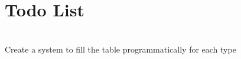\chapter{Todo List }
\hypertarget{todo}{}\label{todo}

\begin{DoxyRefList}
\item[{\parbox[t]{\linewidth}{Member \doxylink{bigint__declaration_8hpp_a1287aa074ee9b5655cbc0d684ee495bc}{powers\+Of10} \+[]}}]\hfill \\
\label{todo__todo000001}%
%
Create a system to fill the table programmatically for each type 
\end{DoxyRefList}
